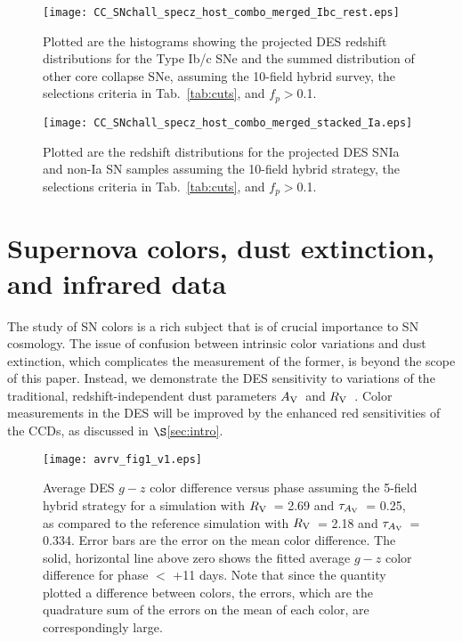 \documentclass[preprint2]{aastex}    %
\newcommand\rv{$R_{\rm V}$}
\newcommand\av{$A_{\rm V}$}
\newcommand\tauav{$\tau_{A_{\rm V}}$}
\begin{document}
\onecolumn
\begin{figure}
\begin{center}
\texttt{[image: CC\_SNchall\_specz\_host\_combo\_merged\_Ibc\_rest.eps]}
\caption{Plotted are the histograms showing the projected DES redshift distributions
for the Type Ib/c SNe and the summed distribution of other core collapse SNe, 
assuming the 10-field hybrid survey, the selections criteria in Tab.~\ref{tab:cuts}, and $f_p>$0.1.}
\label{fig:cc_types}
\end{center}
\end{figure}

\begin{figure}
\begin{center}
\texttt{[image: CC\_SNchall\_specz\_host\_combo\_merged\_stacked\_Ia.eps]}
\caption{Plotted are the redshift distributions for the projected DES SNIa and non-Ia SN samples
assuming the 10-field hybrid strategy, the selections criteria in Tab.~\ref{tab:cuts}, and $f_p>$0.1.}
\label{fig:Ia_vs_cc}
\end{center}
\end{figure}
\twocolumn

\section{Supernova colors, dust extinction, and infrared data}\label{sec:dust}
The study of SN colors is a rich subject that is
of crucial importance to SN cosmology. The issue of 
confusion between intrinsic color variations and dust extinction, 
which complicates the measurement of the former, is beyond the scope 
of this paper.  Instead, we demonstrate the DES sensitivity to variations 
of the traditional, redshift-independent dust parameters
\av\ and \rv\ \citep{car89}. Color measurements in the DES will
be improved by the enhanced red sensitivities of the CCDs, 
as discussed in $\S$\ref{sec:intro}.

\vspace{0.5cm}

\begin{figure}[ht]
\centerline{\texttt{[image: avrv\_fig1\_v1.eps]}}
\caption{Average DES $g-z$ color difference versus phase assuming the 5-field
hybrid strategy for a simulation with 
\rv\ = 2.69 and \tauav\ = 0.25, as compared to the reference simulation with
\rv\ = 2.18 and \tauav\ = 0.334. Error bars are the error on the mean 
color difference. The solid, horizontal line above zero shows 
the fitted average $g-z$ color difference for phase $<$ +11 days.
Note that since the quantity plotted a difference between colors, 
the errors, which are the quadrature sum of the errors on the 
mean of each color, are correspondingly large.
}
\label{fig:avrv1}
\end{figure}
\end{document}
